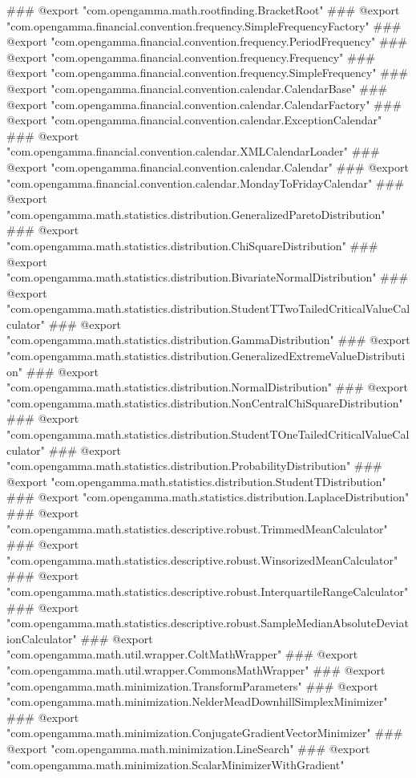 ### @export "com.opengamma.math.rootfinding.BracketRoot"
### @export "com.opengamma.financial.convention.frequency.SimpleFrequencyFactory"
### @export "com.opengamma.financial.convention.frequency.PeriodFrequency"
### @export "com.opengamma.financial.convention.frequency.Frequency"
### @export "com.opengamma.financial.convention.frequency.SimpleFrequency"
### @export "com.opengamma.financial.convention.calendar.CalendarBase"
### @export "com.opengamma.financial.convention.calendar.CalendarFactory"
### @export "com.opengamma.financial.convention.calendar.ExceptionCalendar"
### @export "com.opengamma.financial.convention.calendar.XMLCalendarLoader"
### @export "com.opengamma.financial.convention.calendar.Calendar"
### @export "com.opengamma.financial.convention.calendar.MondayToFridayCalendar"
### @export "com.opengamma.math.statistics.distribution.GeneralizedParetoDistribution"
### @export "com.opengamma.math.statistics.distribution.ChiSquareDistribution"
### @export "com.opengamma.math.statistics.distribution.BivariateNormalDistribution"
### @export "com.opengamma.math.statistics.distribution.StudentTTwoTailedCriticalValueCalculator"
### @export "com.opengamma.math.statistics.distribution.GammaDistribution"
### @export "com.opengamma.math.statistics.distribution.GeneralizedExtremeValueDistribution"
### @export "com.opengamma.math.statistics.distribution.NormalDistribution"
### @export "com.opengamma.math.statistics.distribution.NonCentralChiSquareDistribution"
### @export "com.opengamma.math.statistics.distribution.StudentTOneTailedCriticalValueCalculator"
### @export "com.opengamma.math.statistics.distribution.ProbabilityDistribution"
### @export "com.opengamma.math.statistics.distribution.StudentTDistribution"
### @export "com.opengamma.math.statistics.distribution.LaplaceDistribution"
### @export "com.opengamma.math.statistics.descriptive.robust.TrimmedMeanCalculator"
### @export "com.opengamma.math.statistics.descriptive.robust.WinsorizedMeanCalculator"
### @export "com.opengamma.math.statistics.descriptive.robust.InterquartileRangeCalculator"
### @export "com.opengamma.math.statistics.descriptive.robust.SampleMedianAbsoluteDeviationCalculator"
### @export "com.opengamma.math.util.wrapper.ColtMathWrapper"
### @export "com.opengamma.math.util.wrapper.CommonsMathWrapper"
### @export "com.opengamma.math.minimization.TransformParameters"
### @export "com.opengamma.math.minimization.NelderMeadDownhillSimplexMinimizer"
### @export "com.opengamma.math.minimization.ConjugateGradientVectorMinimizer"
### @export "com.opengamma.math.minimization.LineSearch"
### @export "com.opengamma.math.minimization.ScalarMinimizerWithGradient"
